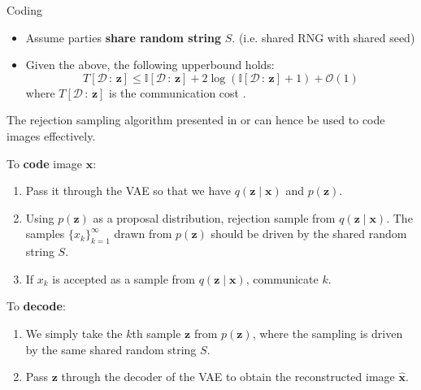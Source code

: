 \documentclass[final]{beamer}
\newlength{\onecolwid}
\newlength{\twocolwid}
\renewcommand{\vec}[1]{\mathbf{#1}}
\newcommand{\D}{\mathcal{D}}
\newcommand{\I}{\mathbb{I}}
\newcommand{\Oh}{\mathcal{O}}
\begin{document}
\begin{frame}[t]
\begin{columns}[t]
\begin{column}{\twocolwid}
\begin{columns}[t,totalwidth=\twocolwid]
\begin{column}{\onecolwid}

  \begin{block}{Coding}
    \noindent
    \begin{itemize}
      \item Assume parties \textbf{share random string} $S$. (i.e. shared RNG
        with shared seed)
      \item Given the above, the following upperbound holds:
        \begin{equation}
          \label{eq:coding_bound}
          T[\D \,:\, \vec{z}] \leq \I[\D \,:\, \vec{z}] + 2\log(\I[\D \,:\, \vec{z}] + 1) + \Oh(1)
        \end{equation}
        where $T[\D \,:\, \vec{z}]$ is the communication cost \cite{harsha2007communication}.
    \end{itemize}
    \noindent
    The rejection sampling algorithm presented in \cite{harsha2007communication}
    or \cite{havasi2018minimal} can hence be used to code images effectively. 

    \noindent To \textbf{code} image $\vec{x}$:
    \begin{enumerate}
      \item Pass it through the VAE so that we have
        $q(\vec{z} \mid \vec{x})$ and $p(\vec{z})$.
      \item Using $p(\vec{z})$ as a proposal distribution, rejection sample 
        from $q(\vec{z} \mid \vec{x})$. The samples $\{x_k\}_{k = 1}^{\infty}$
        drawn from $p(\vec{z})$ should be driven by the shared random string $S$.
      \item If $x_k$ is accepted as a sample from $q(\vec{z} \mid \vec{x})$,
        communicate $k$.
    \end{enumerate}
    \noindent To \textbf{decode}:
    \begin{enumerate}
      \item We simply take the $k$th sample $\vec{z}$ from
        $p(\vec{z})$, where the sampling is driven by the same shared random
        string $S$.
      \item Pass $\vec{z}$ through the decoder of the VAE to obtain the
        reconstructed image $\hat{\vec{x}}$.
    \end{enumerate}
\end{block}




\end{column}
\end{columns}
\end{column}
\end{columns}
\end{frame}
\end{document}
